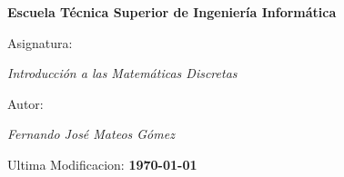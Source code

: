 \begin{titlepage}
        \centering
        {\bfseries\LARGE Escuela Técnica Superior de Ingeniería Informática\par}
        \vspace{1cm}
        {\Large Asignatura: \par \textit{Introducción a las Matemáticas Discretas} \par}
        \vspace{1cm}
        {\Large Autor: \par \textit{Fernando José Mateos Gómez} \par}
        \vspace{2cm}
        {\Large Ultima Modificacion: \textbf{\today} \par}
        \vspace{2cm}
\end{titlepage}
\restoregeometry
